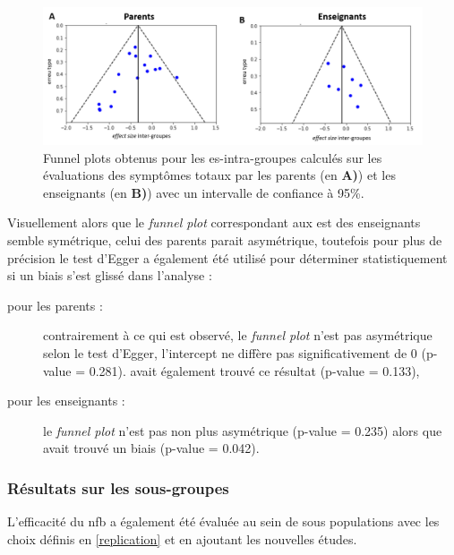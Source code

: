 \begin{figure}[h!]
  \centering
	\includegraphics[width=1\linewidth]{figures/chapter-2/meta-analysis-funnel-plots} 
  \caption{Funnel plots obtenus pour les \gls{es}-intra-groupes calculés sur les évaluations des symptômes totaux par les parents (en \textbf{A)}) et 
	les enseignants (en \textbf{B)}) avec un intervalle de confiance à 95\%.}
  \label{Figure:meta_analysis_funnel_plots}
\end{figure}

Visuellement alors que le \textit{funnel plot} correspondant aux \gls{est} des enseignants semble symétrique, celui des parents parait asymétrique, 
toutefois pour plus de précision le test d'Egger a également été utilisé pour déterminer statistiquement si un biais s'est glissé dans l'analyse :
\begin{description}
\item[pour les parents :] contrairement à ce qui est observé, le \textit{funnel plot} n'est pas asymétrique selon le test d'Egger, l'intercept ne diffère pas 
significativement de 0 (p-value = 0.281). \citet{Cortese2016}
avait également trouvé ce résultat (p-value = 0.133),
\item[pour les enseignants :]  le \textit{funnel plot} n'est pas non plus asymétrique (p-value = 0.235) alors que \citet{Cortese2016} avait trouvé un biais
(p-value = 0.042).
\end{description}

\subsubsection{Résultats sur les sous-groupes}

L'efficacité du \gls{nfb} a également été évaluée au sein de sous populations \citep{Cortese2016} avec les choix définis en \ref{replication} et en ajoutant
les nouvelles études. 

